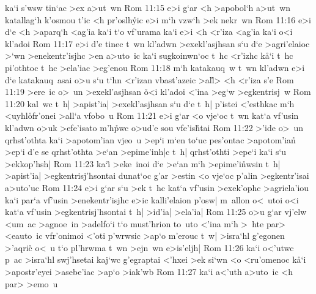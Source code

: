 ka`i
s'wsw
tin`ac
>ex
a>ut~wn\bibvsend
\vs Rom 11:15
e>i
g`ar
<h
>apobol`h
a>ut~wn
katallag`h
k'osmou
t'ic
<h
pr'oslh\r{y}ic
e>i
m`h
vzw`h
>ek
nekr~wn\bibvsend
\vs Rom 11:16
e>i
d`e
<h
>aparq`h
<ag'ia
ka`i
t`o
vf'urama
ka`i
e>i
<h
<r'iza
<ag'ia
ka`i
o<i
kl'adoi\bibvsend
\vs Rom 11:17
e>i
d'e
tinec
t~wn
kl'adwn
>exekl'asjhsan
s`u
d`e
>agri'elaioc
>`wn
>enekentr'isjhc
>en
a>uto~ic
ka`i
sugkoinwn`oc
t~hc
<r'izhc
k\r{a}`i
t~hc
pi'othtoc
t~hc
>ela'iac
>eg'enou\bibvsend
\vs Rom 11:18
m`h
katakauq~w
t~wn
kl'adwn
e>i
d`e
katakauq~asai
o>u
s`u
t`hn
<r'izan
vbast'azeic
>al\r{l}>
<h
<r'iza
s'e\bibvsend
\vs Rom 11:19
>ere~ic
o>~un
>exekl'asjhsan
\r{o}<i
kl'adoi
<'ina
>eg`w
>egkentrisj~w\bibvsend
\vs Rom 11:20
kal~wc
t~h|
>apist'ia|
>exekl'asjhsan
s`u
d`e
t~h|
p'istei
<'esthkac
m`h
<uyhl\r{o}fr'onei
>all`a
vfobo~u\bibvsend
\vs Rom 11:21
e>i
g`ar
<o
vje`oc
t~wn
kat`a
vf'usin
kl'adwn
o>uk
>efe'isato
m'h\r{p}wc
o>ud'e
sou
vfe'is\r{h}tai\bibvsend
{}
\vs Rom 11:22
>'ide
o>~un
qrhst'othta
ka`i
>apotom'ian
vjeo~u
>ep`i
m`en
to`uc
pes'ontac
>apotom'ian\r{}
>ep`i
d'e
se
qrhst'othta
>e`an
>epime'inh|c
t~h|
qrhst'othti
>epe`i
ka`i
s`u
>ekkop'hsh|\bibvsend
\vs Rom 11:23
ka`i\r{}
>eke~inoi
d`e
>e`an
m`h
>epime'i\r{n}wsin
t~h|
>apist'ia|
>egkentrisj'hsontai
dunat`oc
g'ar
>estin
<o
vje`oc
p'alin
>egkentr'isai
a>uto'uc\bibvsend
\vs Rom 11:24
e>i
g`ar
s`u
>ek
t~hc
kat`a
vf'usin
>exek'ophc
>agriela'iou
ka`i
par`a
vf'usin
>enekentr'isjhc
e>ic
kalli'elaion
p'osw|
m~allon
o<~utoi
o<i
kat`a
vf'usin
>egkentrisj'hsontai
t~h|
>id'ia|
>ela'ia|\bibvsend
\vs Rom 11:25
o>u
g`ar
vj'elw
<um~ac
>agnoe~in
>adelfo`i
t`o
must'hrion
to~uto
<'ina
m`h
>~hte
par>
<eauto~ic
vfr'onimoi
<'oti
p'wrwsic
>ap`o
m'erouc
t~w|
>isra`hl
g'egonen
>'aqri\r{c}
o<~u
t`o
pl'hrwma
t~wn
>ejn~wn
e>is'eljh|\bibvsend
\vs Rom 11:26
ka`i
o<'utwc
p~ac
>isra`hl
swj'hsetai
kaj`wc
g'egraptai
<'hxei
>ek
si`wn
<o
<ru'omenoc
k\r{a}`i
>apostr'eyei
>asebe'iac
>ap`o
>iak'wb\bibvsend
\vs Rom 11:27
ka`i
a<'uth
a>uto~ic
<h
par>
>emo~u
